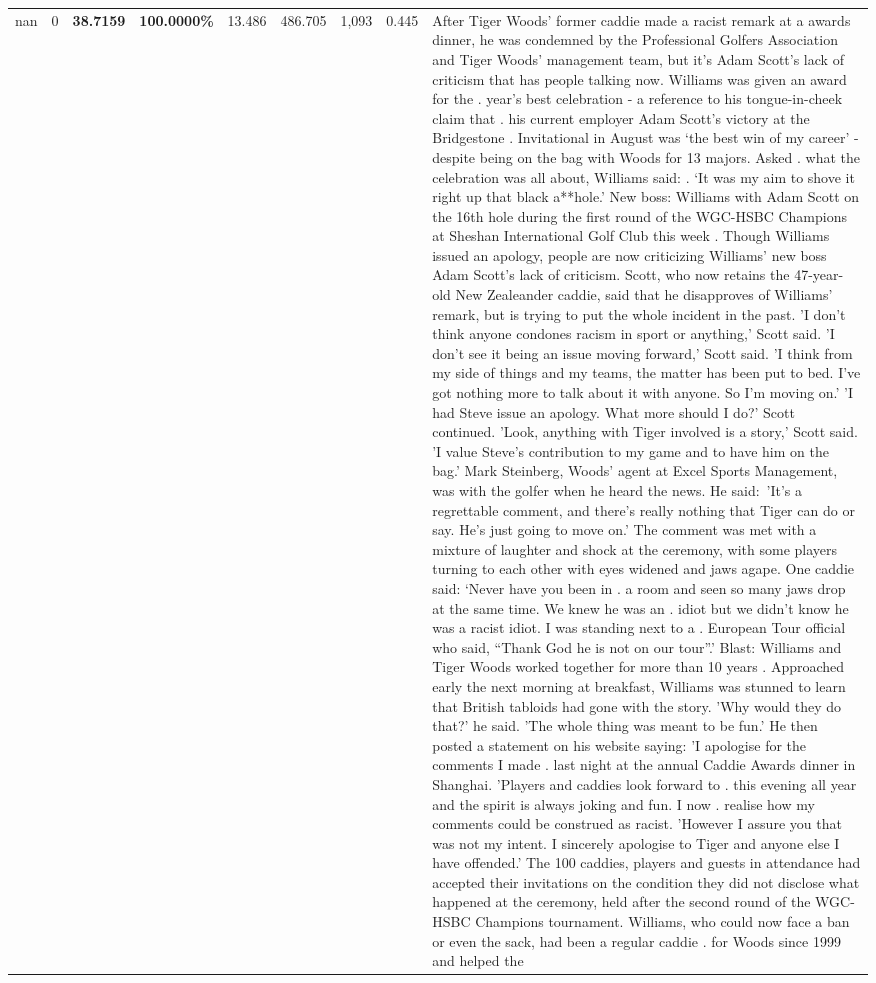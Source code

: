 \begin{table}[H]
\begin{tabular}{lllrlllll}
nan & 0 & \bfseries 38.7159 & \bfseries 100.0000\% & 13.486 & 486.705 & 1,093 & 0.445 & After Tiger Woods' former caddie made a racist remark at a awards dinner, he was condemned by the Professional Golfers Association and Tiger Woods' management team, but it's Adam Scott's lack of criticism that has people talking now. Williams was given an award for the . year’s best celebration - a reference to his tongue-in-cheek claim that . his current employer Adam Scott’s victory at the Bridgestone . Invitational in August was ‘the best win of my career’ - despite being on the bag with Woods for 13 majors. Asked . what the celebration was all about, Williams said: . ‘It was my aim to shove it right up that black a**hole.’ New boss: Williams with Adam Scott  on the 16th hole during the first round of the WGC-HSBC Champions at Sheshan International Golf Club this week . Though Williams issued an apology, people are now criticizing Williams' new boss Adam Scott's lack of criticism. Scott, who now retains the 47-year-old New Zealeander caddie, said that he disapproves of Williams' remark, but is trying to put the whole incident in the past. 'I don't think anyone condones racism in sport or anything,' Scott said. 'I don't see it being an issue moving forward,' Scott said. 'I think from my side of things and my teams, the matter has been put to bed. I've got nothing more to talk about it with anyone. So I'm moving on.' 'I had Steve issue an apology. What more should I do?' Scott continued. 'Look, anything with Tiger involved is a story,' Scott said. 'I value Steve's contribution to my game and to have him on the bag.' Mark Steinberg, Woods' agent at Excel Sports Management, was with the golfer when he heard the news. He said: 'It's a regrettable comment, and there's really nothing that Tiger can do or say. He's just going to move on.' The comment was met with a mixture of laughter and shock at the ceremony, with some players turning to each other with eyes widened and jaws agape. One caddie said: ‘Never have you been in . a room and seen so many jaws drop at the same time. We knew he was an . idiot but we didn’t know he was a racist idiot. I was standing next to a . European Tour official who said, “Thank God he is not on our tour”.’ Blast: Williams and Tiger Woods worked together for more than 10 years . Approached early the next morning at breakfast, Williams was stunned to learn that British tabloids had gone with the story. 'Why would they do that?' he said. 'The whole thing was meant to be fun.' He then posted a statement on his website saying: 'I apologise for the comments I made . last night at the annual Caddie Awards dinner in Shanghai. 'Players and caddies look forward to . this evening all year and the spirit is always joking and fun. I now . realise how my comments could be construed as racist. 'However I assure you that was not my intent. I sincerely apologise to Tiger and anyone else I have offended.' The 100 caddies, players and guests in attendance had accepted their invitations on the condition they did not disclose what happened at the ceremony, held after the second round of the WGC-HSBC Champions tournament. Williams, who could now face a ban or even the sack, had been a regular caddie . for Woods since 1999 and helped the 
\end{tabular}
\end{table}
